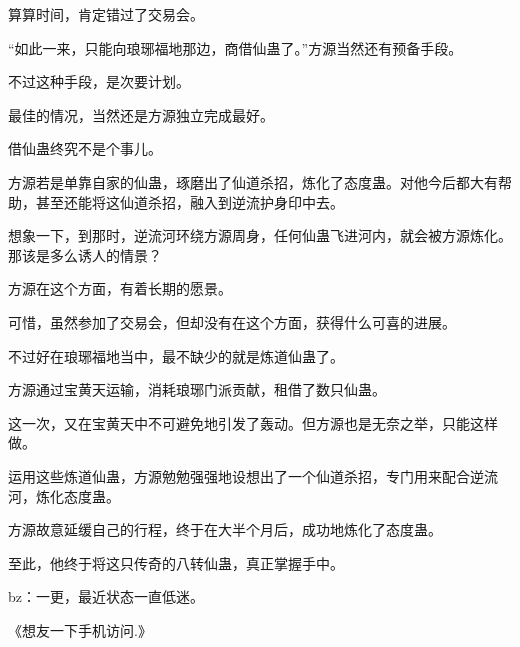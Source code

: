 \begin{this_body}
算算时间，肯定错过了交易会。

“如此一来，只能向琅琊福地那边，商借仙蛊了。”方源当然还有预备手段。

不过这种手段，是次要计划。

最佳的情况，当然还是方源独立完成最好。

借仙蛊终究不是个事儿。

方源若是单靠自家的仙蛊，琢磨出了仙道杀招，炼化了态度蛊。对他今后都大有帮助，甚至还能将这仙道杀招，融入到逆流护身印中去。

想象一下，到那时，逆流河环绕方源周身，任何仙蛊飞进河内，就会被方源炼化。那该是多么诱人的情景？

方源在这个方面，有着长期的愿景。

可惜，虽然参加了交易会，但却没有在这个方面，获得什么可喜的进展。

不过好在琅琊福地当中，最不缺少的就是炼道仙蛊了。

方源通过宝黄天运输，消耗琅琊门派贡献，租借了数只仙蛊。

这一次，又在宝黄天中不可避免地引发了轰动。但方源也是无奈之举，只能这样做。

运用这些炼道仙蛊，方源勉勉强强地设想出了一个仙道杀招，专门用来配合逆流河，炼化态度蛊。

方源故意延缓自己的行程，终于在大半个月后，成功地炼化了态度蛊。

至此，他终于将这只传奇的八转仙蛊，真正掌握手中。

bz：一更，最近状态一直低迷。

《想友一下手机访问.》

\end{this_body}

